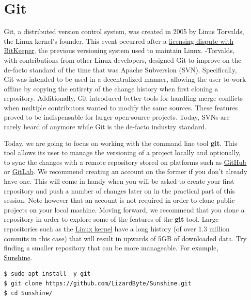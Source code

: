 \section{Git}

Git, a distributed version control system, was created in 2005 by Linus
Torvalds, the Linux kernel's founder. This event occurred after a
\href{https://graphite.dev/blog/bitkeeper-linux-story-of-git-creation}{licensing
dispute with BitKeeper}, the previous versioning system used to maintain Linux.
-Torvalds, with contributions from other Linux developers, designed Git to
improve on the de-facto standard of the time that was Apache Subversion (SVN).
Specifically, Git was intended to be used in a decentralized manner, allowing
the user to work offline by copying the entirety of the change history when
first cloning a repository. Additionally, Git introduced better tools for
handling merge conflicts when multiple contributors wanted to modify the same
sources. These features proved to be indispensable for larger open-source
projects. Today, SVNs are rarely heard of anymore while Git is the de-facto
industry standard.

Today, we are going to focus on working with the command line tool \textbf{git}.
This tool allows its user to manage the versioning of a project locally and
optionally, to sync the changes with a remote repository stored on platforms
such as \href{https://github.com/}{GitHub} or
\href{https://about.gitlab.com/}{GitLab}. We recommend creating an account on
the former if you don't already have one. This will come in handy when you will
be asked to create your first repository and push a number of changes later on
in the practical part of this session. Note however that an account is not
required in order to clone public projects on your local machine. Moving
forward, we recommend that you clone a repository in order to  explore some of
the features of the \textbf{git} tool. Large repositories such as the
\href{https://github.com/torvalds/linux}{Linux kernel} have a long history (of
over 1.3 million commits in this case) that will result in upwards of 5GB of
downloaded data. Try finding a smaller repository that can be more manageable.
For example, \href{https://github.com/LizardByte/Sunshine}{Sunshine}.

\begin{lstlisting}[style=bashstyle]
$ sudo apt install -y git
$ git clone https://github.com/LizardByte/Sunshine.git
$ cd Sunshine/
\end{lstlisting}

